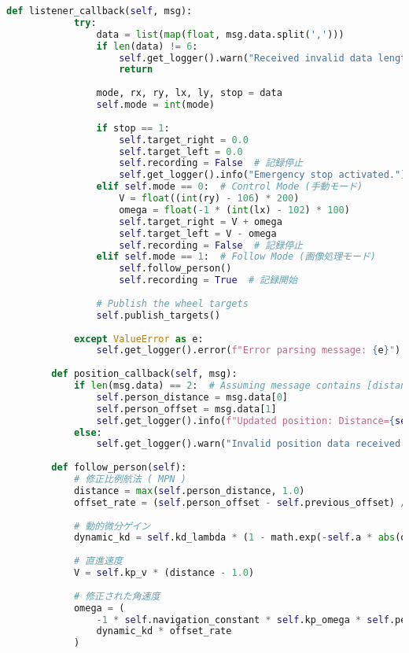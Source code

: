 \begin{lstlisting}[language=Python, caption=Roboware\_node.py]
        def listener_callback(self, msg):
            try:
                data = list(map(float, msg.data.split(',')))
                if len(data) != 6:
                    self.get_logger().warn("Received invalid data length.")
                    return
    
                mode, rx, ry, lx, ly, stop = data
                self.mode = int(mode)
    
                if stop == 1:
                    self.target_right = 0.0
                    self.target_left = 0.0
                    self.recording = False  # 記録停止
                    self.get_logger().info("Emergency stop activated.")
                elif self.mode == 0:  # Control Mode (手動モード)
                    V = float((int(ry) - 106) * 200)
                    omega = float(-1 * (int(lx) - 102) * 100)
                    self.target_right = V + omega
                    self.target_left = V - omega
                    self.recording = False  # 記録停止
                elif self.mode == 1:  # Follow Mode (画像処理モード)
                    self.follow_person()
                    self.recording = True  # 記録開始
    
                # Publish the wheel targets
                self.publish_targets()
    
            except ValueError as e:
                self.get_logger().error(f"Error parsing message: {e}")
    
        def position_callback(self, msg):
            if len(msg.data) == 2:  # Assuming message contains [distance, offset]
                self.person_distance = msg.data[0]
                self.person_offset = msg.data[1]
                self.get_logger().info(f"Updated position: Distance={self.person_distance}, Offset={self.person_offset}")
            else:
                self.get_logger().warn("Invalid position data received.")
    
        def follow_person(self):
            # 修正比例航法 ( MPN )
            distance = max(self.person_distance, 1.0)
            offset_rate = (self.person_offset - self.previous_offset) / self.dt  # 偏差角速度
    
            # 動的微分ゲイン
            dynamic_kd = self.kd_lambda * (1 - math.exp(-self.a * abs(offset_rate))) / (1 + math.exp(-self.a * abs(offset_rate)))
    
            # 直進速度
            V = self.kp_v * (distance - 1.0)
    
            # 修正された角速度
            omega = (
                -1 * self.navigation_constant * self.kp_omega * self.person_offset / distance +
                dynamic_kd * offset_rate
            )
    

\end{lstlisting}
